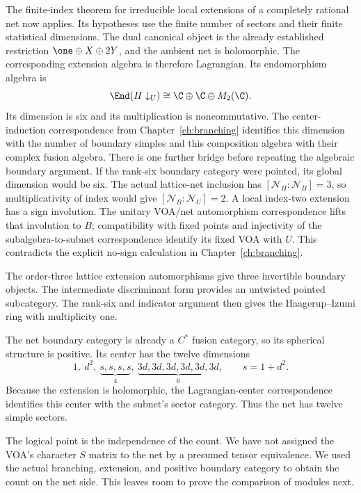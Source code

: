 The finite-index theorem for irreducible local extensions of a
completely rational net now applies. Its hypotheses use the finite
number of sectors and their finite statistical dimensions.
The dual canonical object is the already established restriction
$\one\oplus X\oplus2Y$, and the ambient net is holomorphic.
The corresponding extension algebra is therefore Lagrangian.
Its endomorphism algebra is
\begin{equation}
 \End(H\downarrow_U)\cong\C\oplus\C\oplus M_2(\C).
 \label{eq:unitarity-end}
\end{equation}
Its dimension is six and its multiplication is noncommutative.
The center-induction correspondence from
Chapter~\ref{ch:branching} identifies this dimension with the
number of boundary simples and this composition algebra with
their complex fusion algebra.
There is one further bridge before repeating the algebraic boundary
argument. If the rank-six boundary category were pointed, its
global dimension would be six. The actual lattice-net inclusion
has $[\mathcal N_H:\mathcal N_B]=3$, so multiplicativity
of index would give $[\mathcal N_B:\mathcal N_U]=2$.
A local index-two extension has a
sign involution. The unitary VOA/net automorphism correspondence
lifts that involution to $B$; compatibility with fixed points and
injectivity of the subalgebra-to-subnet correspondence identify its
fixed VOA with $U$. This contradicts the explicit no-sign
calculation in Chapter~\ref{ch:branching}.

The order-three lattice
extension automorphisms give three invertible boundary objects.
The intermediate discriminant form provides an untwisted pointed
subcategory. The rank-six and indicator argument then gives the
Haagerup--Izumi ring with multiplicity one.

The net boundary category is already a $C^*$ fusion category, so
its spherical structure is positive. Its center has the twelve
dimensions
\[
 1,\ d^2,\ \underbrace{s,s,s,s}_{4},\
 \underbrace{3d,3d,3d,3d,3d,3d}_{6},
 \qquad s=1+d^2.
\]
Because the extension is holomorphic, the Lagrangian-center
correspondence identifies this center with the subnet's sector
category. Thus the net has twelve simple sectors.

The logical point is the independence of the count. We have not
assigned the VOA's character $S$ matrix to the net by a presumed
tensor equivalence. We used the actual branching, extension, and
positive boundary category to obtain the count on the net side.
This leaves room to prove the comparison of modules next.

